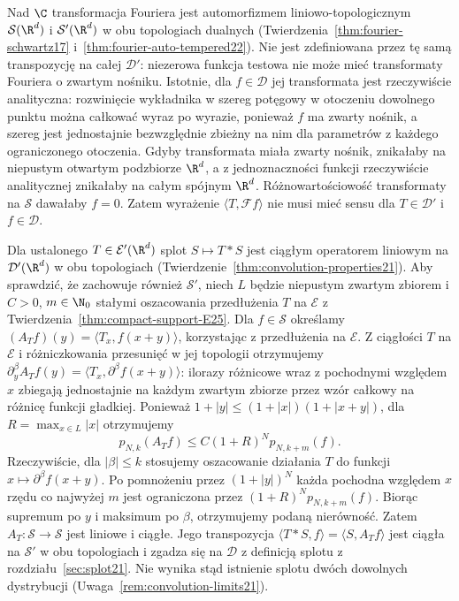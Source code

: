 \begin{uwaga}
\label{rem:fourier-conv25}
Nad $\C$ transformacja Fouriera jest automorfizmem
liniowo-topologicznym $\mathcal S(\R^d)$ i
$\mathcal S'(\R^d)$ w obu topologiach dualnych
(Twierdzenia~\ref{thm:fourier-schwartz17}
i~\ref{thm:fourier-auto-tempered22}).
Nie jest zdefiniowana przez tę samą transpozycję
na całej $\mathcal D'$: niezerowa funkcja testowa
nie może mieć transformaty Fouriera o zwartym nośniku.
Istotnie, dla $f\in\mathcal D$ jej transformata
jest rzeczywiście analityczna: rozwinięcie wykładnika
w szereg potęgowy w otoczeniu dowolnego punktu
można całkować wyraz po wyrazie, ponieważ $f$ ma
zwarty nośnik, a szereg jest jednostajnie bezwzględnie
zbieżny na nim dla parametrów z każdego ograniczonego
otoczenia. Gdyby transformata miała zwarty nośnik,
znikałaby na niepustym otwartym podzbiorze $\R^d$,
a z jednoznaczności funkcji rzeczywiście analitycznej
znikałaby na całym spójnym $\R^d$.
Różnowartościowość transformaty na $\mathcal S$
dawałaby $f=0$. Zatem wyrażenie
$\langle T,\mathcal F f\rangle$ nie musi mieć sensu
dla $T\in\mathcal D'$ i $f\in\mathcal D$.

Dla ustalonego $T\in\mathcal E'(\R^d)$ splot
$S\mapsto T*S$ jest ciągłym operatorem liniowym
na $\mathcal D'(\R^d)$ w obu topologiach
(Twierdzenie~\ref{thm:convolution-properties21}).
Aby sprawdzić, że zachowuje również $\mathcal S'$,
niech $L$ będzie niepustym zwartym zbiorem i $C>0$, $m\in\N_0$
stałymi oszacowania przedłużenia $T$ na $\mathcal E$
z Twierdzenia~\ref{thm:compact-support-E25}.
Dla $f\in\mathcal S$ określamy
$(A_Tf)(y)=\langle T_x,f(x+y)\rangle$,
korzystając z przedłużenia na $\mathcal E$.
Z ciągłości $T$ na $\mathcal E$ i różniczkowania
przesunięć w jej topologii otrzymujemy
$\partial_y^\beta A_T f(y)=
\langle T_x,\partial^\beta f(x+y)\rangle$:
ilorazy różnicowe wraz z pochodnymi względem $x$
zbiegają jednostajnie na każdym zwartym zbiorze
przez wzór całkowy na różnicę funkcji gładkiej.
Ponieważ $1+|y|\le(1+|x|)(1+|x+y|)$, dla
$R=\max_{x\in L}|x|$ otrzymujemy
\[
 p_{N,k}(A_Tf)\le C(1+R)^N p_{N,k+m}(f).
\]
Rzeczywiście, dla $|\beta|\le k$ stosujemy oszacowanie
działania $T$ do funkcji $x\mapsto\partial^\beta f(x+y)$.
Po pomnożeniu przez $(1+|y|)^N$ każda pochodna
względem $x$ rzędu co najwyżej $m$ jest ograniczona
przez $(1+R)^N p_{N,k+m}(f)$.
Biorąc supremum po $y$ i maksimum po $\beta$,
otrzymujemy podaną nierówność.
Zatem $A_T:\mathcal S\to\mathcal S$ jest liniowe
i ciągłe. Jego transpozycja
$\langle T*S,f\rangle=\langle S,A_Tf\rangle$
jest ciągła na $\mathcal S'$ w obu topologiach
i zgadza się na $\mathcal D$ z definicją splotu
z rozdziału~\ref{sec:splot21}.
Nie wynika stąd istnienie splotu dwóch dowolnych
dystrybucji (Uwaga~\ref{rem:convolution-limits21}).
\end{uwaga}

